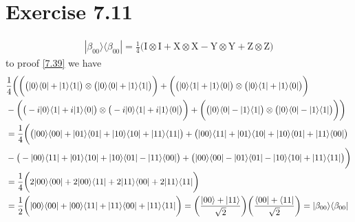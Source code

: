 \documentclass{article}
\newcommand{\op}[2]{|#1\rangle \langle#2|}
\newcommand{\tensor}[2]{#1 \otimes #2}
\begin{document}
\section*{Exercise 7.11}
\begin{align}
    \op{\beta_{00}}{\beta_{00}} = \frac{1}{4}\bigg(\tensor{\text{I}}{\text{I}}+\tensor{\text{X}}{\text{X}}-\tensor{\text{Y}}{\text{Y}}+\tensor{\text{Z}}{\text{Z}}\bigg) \label{7.39}
\end{align}
to proof \ref{7.39} we have
 \begin{align*}
    &\frac{1}{4}\bigg(\bigg(\tensor{\big(\op{0}{0}+\op{1}{1}\big)}{\big(\op{0}{0}+\op{1}{1}\big)}\bigg)+\bigg(\tensor{\big(\op{0}{1}+\op{1}{0}\big)}{\big(\op{0}{1}+\op{1}{0}\big)}\bigg)\\&
    -\bigg(\tensor{\big(-i\op{0}{1}+i\op{1}{0}\big)}{\big(-i\op{0}{1}+i\op{1}{0}\big)}\bigg)+\bigg(\tensor{\big(\op{0}{0}-\op{1}{1}\big)}{\big(\op{0}{0}-\op{1}{1}\big)}\bigg)\bigg) \\
    &= \frac{1}{4}\bigg(\big(\op{00}{00}+\op{01}{01}+\op{10}{10}+\op{11}{11}\big)+\big(\op{00}{11}+\op{01}{10}+\op{10}{01}+\op{11}{00}\big)\\
    &-\big(-\op{00}{11}+\op{01}{10}+\op{10}{01}-\op{11}{00}\big)+\big(\op{00}{00}-\op{01}{01}-\op{10}{10}+\op{11}{11}\big)\bigg)\\
    &=\frac{1}{4}\bigg(2\op{00}{00}+2\op{00}{11}+2\op{11}{00}+2\op{11}{11}\bigg)\\
    &=\frac{1}{2}\bigg(\op{00}{00}+\op{00}{11}+\op{11}{00}+\op{11}{11}\bigg) = \bigg(\frac{\ket{00}+\ket{11}}{\sqrt{2}}\bigg)\bigg(\frac{\bra{00}+\bra{11}}{\sqrt{2}}\bigg) = \op{\beta_{00}}{\beta_{00}}
 \end{align*}
\end{document}
